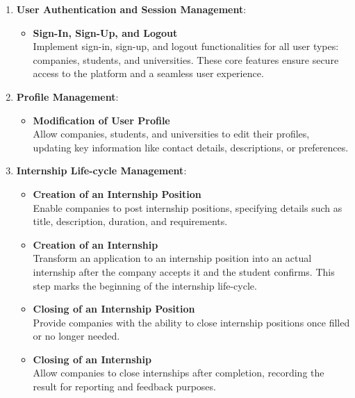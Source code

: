 \begin{enumerate}
    \item \textbf{User Authentication and Session Management}:
    \begin{itemize}
        \item \textbf{Sign-In, Sign-Up, and Logout}
        \\Implement sign-in, sign-up, and logout functionalities for all user types: companies, students, and universities. These core features ensure secure access to the platform and a seamless user experience.
    \end{itemize}

    \item \textbf{Profile Management}:
    \begin{itemize}
        \item \textbf{Modification of User Profile}
        \\Allow companies, students, and universities to edit their profiles, updating key information like contact details, descriptions, or preferences.
    \end{itemize}

    \item \textbf{Internship Life-cycle Management}:
    \begin{itemize}
        \item \textbf{Creation of an Internship Position}
        \\Enable companies to post internship positions, specifying details such as title, description, duration, and requirements.
        \item \textbf{Creation of an Internship}
        \\Transform an application to an internship position into an actual internship after the company accepts it and the student confirms. This step marks the beginning of the internship life-cycle.
        \item \textbf{Closing of an Internship Position}
        \\Provide companies with the ability to close internship positions once filled or no longer needed.
        \item \textbf{Closing of an Internship}
        \\Allow companies to close internships after completion, recording the result for reporting and feedback purposes.
    \end{itemize}


\end{enumerate}

